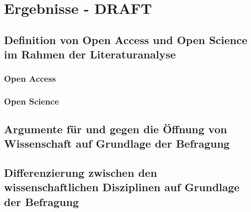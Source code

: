 \chapter{Ergebnisse - DRAFT}

\section{Definition von Open Access und Open Science im Rahmen der Literaturanalyse}
\subsection{Open Access}
\subsection{Open Science}
\section{Argumente für und gegen die Öffnung von Wissenschaft auf Grundlage der Befragung}
\section{Differenzierung zwischen den wissenschaftlichen Disziplinen auf Grundlage der Befragung}